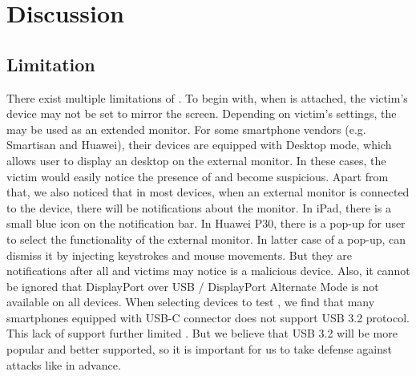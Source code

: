 \section{Discussion}
\label{sec:discussion}

\subsection{Limitation}
There exist multiple limitations of \tool. To begin with, when \tool is attached, the victim's device may not be set to mirror the screen. Depending on victim's settings, the \tool may be used as an extended monitor. For some smartphone vendors (e.g. Smartisan and Huawei), their devices are equipped with Desktop mode, which allows user to display an desktop on the external monitor. In these cases, the victim would easily notice the presence of \tool and become suspicious. Apart from that, we also noticed that in most devices, when an external monitor is connected to the device, there will be notifications about the monitor. In iPad, there is a small blue icon on the notification bar. In Huawei P30, there is a pop-up for user to select the functionality of the external monitor. In latter case of a pop-up, \tool can dismiss it by injecting keystrokes and mouse movements. But they are notifications after all and victims may notice \tool is a malicious device. Also, it cannot be ignored that DisplayPort over USB / DisplayPort Alternate Mode is not available on all devices. When selecting devices to test \tool, we find that many smartphones equipped with USB-C connector does not support USB 3.2 protocol. This lack of support further limited \tool. But we believe that USB 3.2 will be more popular and better supported, so it is important for us to take defense against attacks like \tool in advance.
\begin{comment}
There exist multiple limitations of \tool.  To begin with, \tool can only gain
the information and control access of the host itself instead of external
hardware.  Consequently, as we introduced in the
Section~\ref{sec:countermeasures}, \tool can hardly bypass the defense
approaches that use external hardware for authorization.  Moreover, most of
the devices will prompt users to give authentication to the USB devices or
select one of the functional modes after they are plugged in.  Though some of
such prompts are not conspicuous for non-experts, especially when \tool is
concealed within other functional hardware such as power banks \shuqing{If
there is experiment, add it here.}, the probability of whether users could get
aware that something unusual happens will increase with the existence of these
prompting messages.
\end{comment}
